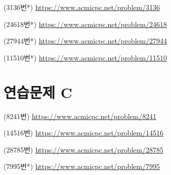 \begin{problem}
    (3136번*) \url{https://www.acmicpc.net/problem/3136}
\end{problem}
\begin{problem}
    (24618번*) \url{https://www.acmicpc.net/problem/24618}
\end{problem}
\begin{problem}
    (27944번*) \url{https://www.acmicpc.net/problem/27944}
\end{problem}
\begin{problem}
    (11510번*) \url{https://www.acmicpc.net/problem/11510}
\end{problem}

\section{연습문제 C}
\begin{problem}
    (8241번) \url{https://www.acmicpc.net/problem/8241}
\end{problem}
\begin{problem}
    (14516번) \url{https://www.acmicpc.net/problem/14516}
\end{problem}
\begin{problem}
    (28785번) \url{https://www.acmicpc.net/problem/28785}
\end{problem}
\begin{problem}
    (7995번*) \url{https://www.acmicpc.net/problem/7995}
\end{problem}